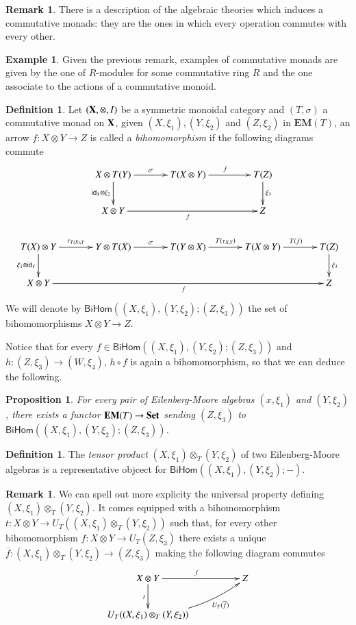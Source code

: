 \documentclass[12pt]{article}
\newtheorem{proposition}[lemma]{Proposition}
\theoremstyle{definition}
\newtheorem{definition}[lemma]{Definition}
\newtheorem{remark}[lemma]{Remark}
\newtheorem{example}[lemma]{Example}
\newcommand{\Set}{\textbf{\textup{Set}}}
\newcommand{\eim}[1]{\mathbf{EM}{(#1)}}
\newcommand{\bi}[3]{\mathsf{BiHom}(#1,#2;#3)}
\numberwithin{equation}{section}
\newcommand{\id}[1]{\mathsf{id}_{#1}}
\def\X{\textbf {\textup{X}}}
\begin{document}
\begin{remark}There is a description of the algebraic theories which induces a commutative monads: they are the ones in which every operation commutes with every other.
\end{remark}
\begin{example}
	Given the previous remark, examples of commutative monads are given by the one of $R$-modules for some commutative ring $R$ and the one associate to the actions of a commutative monoid.
\end{example}
	
	\begin{definition}
		Let $(\X, \otimes, I)$ be a symmetric monoidal category and $(T,\sigma)$ a commutative monad on $\X$, given $(X, \xi_1), (Y, \xi_2)$ and $(Z, \xi_2)$ in $\eim{T}$, an arrow $f:X\otimes Y\to Z$ is called a \emph{bihomomorphism}  if the following diagrams commute
		\[\xymatrix@C=35pt{&X\otimes T(Y)  \ar[r]^{\sigma} \ar[d]_{\id{X}\otimes \xi_2} & T(X\otimes Y)  \ar[r]^{f}& T(Z) \ar[d]^{\xi_3}\\
	&	X\otimes Y \ar[rr]_{f} & & Z\\
T(X)\otimes Y \ar[d]_{\xi_1\otimes \id{Y}}\ar[r]^{\tau_ {T(X), Y}} & Y\otimes T(X) \ar[r]^\sigma& T(Y\otimes X) \ar[r]^{T(\tau_{X,Y})} & T(X\otimes Y) \ar[r]^{T(f)} & T(Z)\ar[d]^{\xi_3}\\
X\otimes Y \ar[rrrr]_{f} & & & & Z}\]
We will denote  by $\bi{(X,\xi_1)}{(Y,\xi_2)}{(Z,\xi_3)}$ the set of bihomomorphisms $X\otimes Y\to Z$.
	\end{definition}
	
	Notice that for every $f\in \bi{(X,\xi_1)}{(Y,\xi_2)}{(Z,\xi_3)}$ and $h:(Z, \xi_3)\to (W, \xi_4)$, $h\circ f$ is again a bihomomorphism, so that we can deduce the following.
	
	\begin{proposition}
	For every pair of Eilenberg-Moore algebras $(x, \xi_1)$ and $(Y, \xi_2)$, there exists a functor $\eim{T} \to \Set$ sending $(Z, \xi_3)$ to $\bi{(X,\xi_1)}{(Y,\xi_2)}{(Z,\xi_3)}$. 
	\end{proposition}

\begin{definition}
The \emph{tensor product} $(X, \xi_1)\otimes_T(Y, \xi_2)$ of two Eilenberg-Moore algebras is a representative objcect for  $\bi{(X,\xi_1)}{(Y,\xi_2)}{-}$.
\end{definition}

\begin{remark}
	We can spell out more explicity the universal property defining $(X, \xi_1)\otimes_T(Y, \xi_2)$. It comes equipped with a bihomomorphism $t:X\otimes Y\to U_T((X, \xi_1)\otimes_T(Y, \xi_2))$ such that, for every other bihomomorphism $f:X\otimes Y \to U_T(Z, \xi_3)$ there exists a unique $\overline{f}:(X, \xi_1)\otimes_T(Y, \xi_2)\to (Z, \xi_3)$ making the following diagram commutes
	\[\xymatrix@C=50pt{X\otimes Y  \ar[r]^{f} \ar[d]_{t}&  Z\\
	U_T((X, \xi_1)\otimes_T(Y, \xi_2)) \ar@/_0.3cm/[ur]_-{U_T(\overline{f})}}\]
\end{remark}
\end{document}
